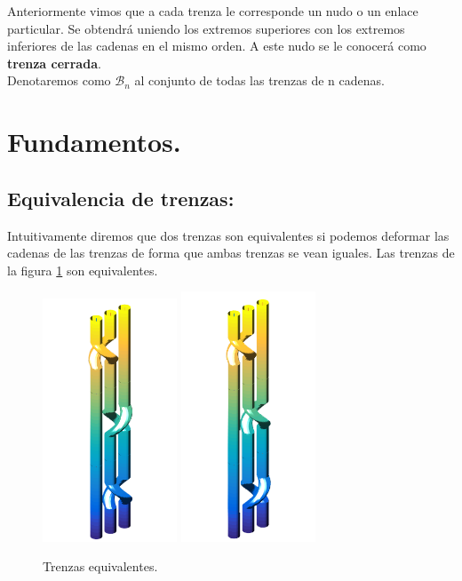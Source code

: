 Anteriormente vimos que a cada trenza le corresponde un nudo o un enlace particular. Se obtendrá uniendo los extremos superiores con los extremos inferiores de las cadenas en el mismo orden. A este nudo se le conocerá como \textbf{trenza cerrada}.\\
Denotaremos como $\mathscr{B}_{n}$ al conjunto de todas las trenzas de n cadenas.\\

\section{Fundamentos.}
\begin{center}
	\subsection{Equivalencia de trenzas:}
\end{center}
Intuitivamente diremos que dos trenzas son equivalentes si podemos deformar las cadenas de las trenzas de forma que ambas trenzas se vean iguales. Las trenzas de la figura \ref{tren3} son equivalentes.
\begin{figure}[h!]
	\centering
	\includegraphics[width=4cm]{itrenzas/t3.png}
	\space
	\includegraphics[width=4cm]{itrenzas/t4.png}
	\caption{Trenzas equivalentes.}
	\label{tren3} 
\end{figure}

